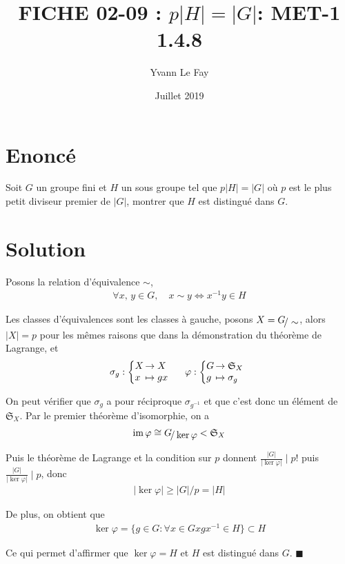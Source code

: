 \documentclass{article}
\newcommand*{\QED}{\hfill\ensuremath{\blacksquare}}%
\DeclareMathOperator{\im}{im}
\begin{document}
\title{FICHE 02-09 : $p|H|=|G|$: MET-1 1.4.8}
\author{Yvann Le Fay}
\date{Juillet 2019}
\maketitle
\section*{Enoncé}
Soit $G$ un groupe fini et $H$ un sous groupe tel que $p|H|=|G|$ où $p$ est le plus petit diviseur premier de $|G|$, montrer que $H$ est distingué dans $G$.
\section*{Solution}
Posons la relation d'équivalence $\sim$,
\begin{align*}
\forall x,\, y\in G,\quad x\sim y \Longleftrightarrow x^{-1}y\in H
\end{align*}

Les classes d'équivalences sont les classes à gauche, posons $X=G\!\raisebox{-.50ex}{\ensuremath{/ \sim}}$, alors $|X|=p$ pour les mêmes raisons que dans la démonstration du théorème de Lagrange, et
\begin{align*}
\sigma_g : \left\{
     \begin{array}{@{}l@{\thinspace}l}
     X&\to X\\
     x&\mapsto gx
     \end{array}\right. \quad \varphi : \left\{
     \begin{array}{@{}l@{\thinspace}l}
     G&\to \mathfrak{S}_X\\
     g&\mapsto \sigma_g
     \end{array}\right. 
\end{align*}

On peut vérifier que $\sigma_g$ a pour réciproque $\sigma_{g^{-1}}$ et que c'est donc un élément de $\mathfrak{S}_X$. Par le premier théorème d'isomorphie, on a
\begin{align*}
\im \varphi \cong G\!\raisebox{-.50ex}{\ensuremath{/ \ker \varphi}}< \mathfrak{S}_X
\end{align*}

Puis le théorème de Lagrange et la condition sur $p$ donnent $\frac{|G|}{|\ker \varphi|}\mid p!$ puis $\frac{|G|}{|\ker \varphi|}\mid p$, donc 
\begin{align*}
|\ker \varphi|\geq |G|/p=|H|
\end{align*} 

De plus, on obtient que 
\begin{align*}
\ker \varphi =\{g\in G :\forall x\in G xgx^{-1}\in H\}\subset H
\end{align*}

Ce qui permet d'affirmer que $\ker \varphi = H$ et $H$ est distingué dans $G$.
\QED
\end{document}
